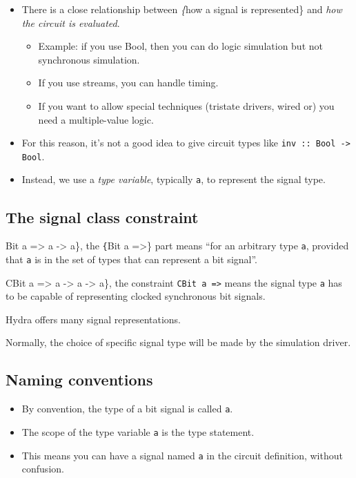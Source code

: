 \documentclass[11pt]{article}
\begin{document}
\begin{itemize}
\item There is a close relationship between \emph\{how a signal is
represented\} and \emph{how the circuit is evaluated}.

\begin{itemize}
\item Example: if you use Bool, then you can do logic simulation
but not synchronous simulation.
\item If you use streams, you can handle timing.
\item If you want to allow special techniques (tristate drivers,
wired or) you need a multiple-value logic.
\end{itemize}

\item For this reason, it's not a good idea to give circuit types
like \texttt{inv :: Bool -> Bool}.
\item Instead, we use a \emph{type variable}, typically \texttt{a},
to represent the signal type.
\end{itemize}

\subsection{The signal class constraint}
\label{sec:org2364a20}

\begin{description}
\item[{When you write \texttt\{inv}] Bit a => a -> a\}, the \texttt\{Bit
a =>\} part means ``for an arbitrary type \texttt{a}, provided that
\texttt{a} is in the set of types that can represent a bit signal''.
\item[{Similarly, \texttt\{reg1}] CBit a => a -> a -> a\}, the
constraint \texttt{CBit a =>} means the signal type \texttt{a} has
to be capable of representing clocked synchronous bit signals.
\item Hydra offers many signal representations.
\item Normally, the choice of specific signal type will be made by the
simulation driver.
\end{description}

\subsection{Naming conventions}
\label{sec:org5281e64}

\begin{itemize}
\item By convention, the type of a bit signal is called \texttt{a}.
\item The scope of the type variable \texttt{a} is the type
statement.
\item This means you can have a signal named \texttt{a} in the
circuit definition, without confusion.
\end{itemize}
\end{document}
